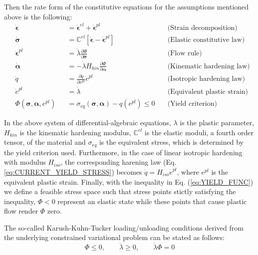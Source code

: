 Then the rate form of the constitutive equations for the assumptions mentioned 
above is the following:
\begin{subequations}
	\begin{alignat}{3}
		&\dot{\bm{\epsilon}} &&= \dot{\bm{\epsilon}}^{el} +
		\dot{\bm{\epsilon}}^{pl}\quad& \text{(Strain 
		decomposition)}\label{eq:RATE_DECOMP}\\
		&\dot{\bm{\sigma}} &&= \mathbb{C}^{el}\left[\dot{\bm{\epsilon}} -
		\dot{\bm{\epsilon}}^{pl} \right]\quad& \text{(Elastic constitutive 
		law)}\label{eq:CONSTITUTIVE_LAW}\\
		&\dot{\bm{\epsilon}}^{pl} &&= \dot{\lambda}\frac{\partial \Phi}{\partial
			\bm{\sigma}}\quad& \text{(Flow rule)}\label{eq:FLOW_RULE}\\
		&\dot{\bm{\alpha}} &&= -\dot{\lambda}H_{kin}\frac{\partial 
		\Phi}{\partial
			\bm{\alpha}}\quad& \text{(Kinematic
			hardening law)}\label{eq:BACK_STRESS}\\
		&\dot{q} &&= \frac{\partial q}{\partial
			e^{pl}}\dot{e}^{pl}\quad& \text{(Isotropic hardening law)}
		\label{eq:CURRENT_YIELD_STRESS}\\
		&\dot{e}^{pl} &&= \dot{\lambda}\quad& \text{(Equivalent plastic 
		strain)}\label{eq:EQUIV_PLASTIC_STRAIN}\\
		&\Phi(\bm{\sigma},\bm{\alpha},e^{pl}) &&= 
		\sigma_{eq}(\bm{\sigma},\bm{\alpha}) - q(e^{pl}) \leq 0\quad&
		\text{(Yield criterion)}\label{eq:YIELD_FUNC} 
	\end{alignat}
	\label{eq:THREE_D_RATE}
\end{subequations}

In the above system of differential-algebraic equations, $\lambda$ is the 
plastic
parameter, $H_{kin}$ is the kinematic hardening modulus, $\mathbb{C}^{el}$ is 
the elastic moduli, a fourth order tensor, of the material and $\sigma_{eq}$ is 
the equivalent stress, which is determined by the
yield criterion used. Furthermore, in the case of linear
isotropic hardening with modulus $H_{iso}$, the corresponding harening law (Eq. 
\ref{eq:CURRENT_YIELD_STRESS}) becomes $\dot{q} =
H_{iso}\dot{e}^{pl}$, where $e^{pl}$ is the equivalent plastic strain. Finally, 
with the inequality in Eq. (\ref{eq:YIELD_FUNC})
we define a feasible stress space such that stress points stictly satisfying the
inequality, $\Phi<0$ represent an elastic state while these points that cause 
plastic flow render $\Phi$ zero.

The so-called Karush-Kuhn-Tucker loading/unloading conditions derived from the 
underlying constrained variational problem\cite{Simo2006} can be stated as
follows:
\begin{equation}
	\Phi\leq 0,\qquad \dot{\lambda} \geq 0,\qquad \dot{\lambda}\Phi=0
	\label{eq:KKT_CONDITIONS}
\end{equation}

